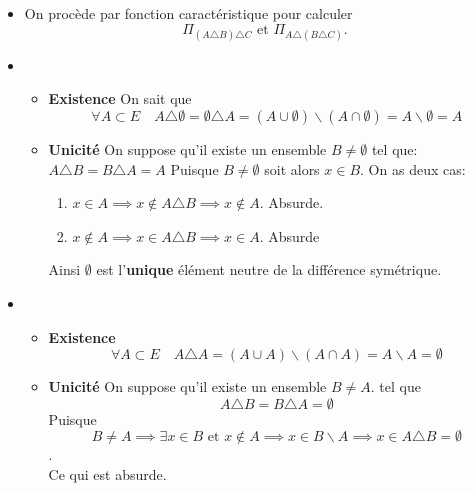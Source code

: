 \documentclass{report}
\begin{document}
\begin{myproof}
  \begin{itemize}
    \item On procède par fonction caractéristique pour calculer 
      $$
      \varPi_{(A \triangle B )\triangle C} \text{ et } \varPi_{A \triangle ( B
      \triangle C)}. 
      $$
    \item
      \begin{itemize}
        \item \textbf{Existence}
          On sait que 
          $$
          \forall A \subset E \quad A \triangle \emptyset = \emptyset \triangle A
          =  (A\cup \emptyset) \backslash (A \cap \emptyset)  = A \backslash
          \emptyset = A
          $$
        \item \textbf{Unicité}
          On suppose qu'il existe un ensemble $B \ne \emptyset$ tel que:
          $
A \triangle B = B \triangle A = A
$
Puisque $B \ne \emptyset$ soit alors $x \in B$.
 On as deux cas:
 \begin{enumerate}
   \item $x\in A \implies x \not\in A\triangle B \implies x \not \in A$. Absurde.
   \item $x\not\in A \implies x \in A\triangle B \implies x \in A$. Absurde
 \end{enumerate}

 Ainsi $\emptyset$ est l'\textbf{unique} élément neutre de la différence
 symétrique.

      \end{itemize}
    \item  
      \begin{itemize}
        \item \textbf{Existence}
          $$
          \forall A \subset E \quad A \triangle A = (A\cup A) \backslash (A \cap
          A) = A \backslash A = \emptyset
          $$
        \item \textbf{Unicité}
          On suppose qu'il existe un ensemble $B \ne A$. tel que 
          $$
          A\triangle B = B \triangle A = \emptyset
          $$
        Puisque $$B\ne A \implies \exists x \in B \text{ et } x \not\in A\implies
        x \in B\backslash A \implies x \in A \triangle B = \emptyset$$.\\
        Ce qui est absurde.
      \end{itemize}
  \end{itemize}
\end{myproof}

\end{document}

